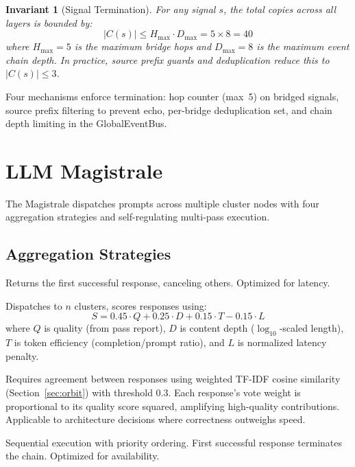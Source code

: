 \documentclass[journal,10pt]{IEEEtran}
\newtheorem{invariant}{Invariant}
\begin{document}
\begin{invariant}[Signal Termination]
\label{inv:termination}
For any signal $s$, the total copies across all layers is bounded by:
\begin{equation}
|C(s)| \leq H_{\max} \cdot D_{\max} = 5 \times 8 = 40
\label{eq:termination}
\end{equation}
where $H_{\max} = 5$ is the maximum bridge hops and $D_{\max} = 8$ is the maximum event chain depth. In practice, source prefix guards and deduplication reduce this to $|C(s)| \leq 3$.
\end{invariant}

Four mechanisms enforce termination: hop counter (max~5) on bridged signals, source prefix filtering to prevent echo, per-bridge deduplication set, and chain depth limiting in the GlobalEventBus.

\section{LLM Magistrale}
\label{sec:magistrale}

The Magistrale dispatches prompts across multiple cluster nodes with four aggregation strategies and self-regulating multi-pass execution.

\subsection{Aggregation Strategies}

\begin{description}[nosep,style=unboxed,leftmargin=0pt,font=\normalfont\itshape]
\item[First-wins.] Returns the first successful response, canceling others. Optimized for latency.
\item[Best-of-$n$.] Dispatches to $n$ clusters, scores responses using:
\begin{equation}
S = 0.45 \cdot Q + 0.25 \cdot D + 0.15 \cdot T - 0.15 \cdot L
\label{eq:score}
\end{equation}
where $Q$ is quality (from pass report), $D$ is content depth ($\log_{10}$-scaled length), $T$ is token efficiency (completion/prompt ratio), and $L$ is normalized latency penalty.
\item[Consensus.] Requires agreement between responses using weighted TF-IDF cosine similarity (Section~\ref{sec:orbit}) with threshold 0.3. Each response's vote weight is proportional to its quality score squared, amplifying high-quality contributions. Applicable to architecture decisions where correctness outweighs speed.
\item[Fallback-chain.] Sequential execution with priority ordering. First successful response terminates the chain. Optimized for availability.
\end{description}
\end{document}
